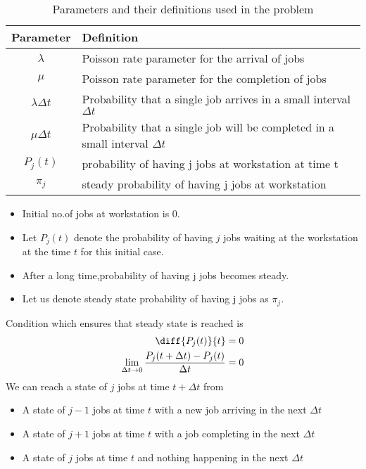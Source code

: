  \begin{table}[h]
\begin{tabular}{|c|p{6cm}|}
\hline
\textbf{Parameter} & \textbf{Definition}                               \\ \hline
$\lambda$          & Poisson rate parameter for the arrival of jobs    \\ \hline
$\mu$              & Poisson rate parameter for the completion of jobs \\ \hline
$\lambda \Delta t$ & Probability that a single job arrives in a small interval $\Delta t$\\\hline 
$\mu \Delta t$ & Probability that a single job will be completed in a small interval $\Delta t$\\\hline 
$P_j(t)$             & probability of having j jobs at workstation at time t \\\hline
$\pi_j$            & steady probability of having j jobs at workstation\\\hline
\end{tabular}
\caption{Parameters and their definitions used in the problem}
\label{me2021-42:tab:parameters}
\end{table}
 \begin{itemize}
     \item  Initial no.of jobs at workstation is 0.
     \item Let $P_{j}(t)$ denote the probability of having $j$ jobs waiting at the workstation at the time $t$ for this initial case.
     \item After a long time,probability of having  j jobs becomes steady.
     \item Let us denote steady state probability of having j jobs as $\pi_j$.
 \end{itemize}
 Condition which ensures that steady state is reached is
 \begin{align}
     \diff{P_j(t)}{t}&=0\\
     \lim_{\Delta t\rightarrow 0}\dfrac{P_j(t+\Delta t)-P_j (t)}{\Delta t}&=0\label{me2021-42:steady-condition}
 \end{align}
  We can reach a state of $j$ jobs at time $t+\Delta t$ from
  \begin{itemize}
      \item A state of $j-1$ jobs at time $t$ with a new job arriving in the next $\Delta t$
      \item A state of $j+1$ jobs at time $t$ with a job completing in the next $\Delta t$
      \item A state of $j$ jobs at time $t$ and nothing happening in the next $\Delta t$
  \end{itemize}
